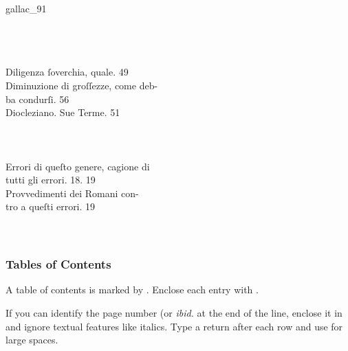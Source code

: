 
\begin{sampleImage}[ 2]{gallac_91}

\begin{typeLatin}
 \\
 \\
\someText \\
Diligenza ſoverchia, quale.  49 \\
Diminuzione di groſſezze, come deb- \\
 ba condurſi.  56 \\
Diocleziano. Sue Terme.  51  \\
\someText \\
 \\
\someText \\
Errori di queſto genere, cagione di \\
 tutti gli errori.  18. 19 \\
 Provvedimenti dei Romani con- \\
 tro a queſti errori.  19 \\
\someText \\
 \\
\end{typeLatin}
\end{sampleImage}


\subsubsection{Tables of Contents}
\label{section tables of contents}

\begin{mainrule}
  A table of contents is marked by . Enclose each entry with .

  If you can identify the page number (or \emph{ibid.} at the end of the line, enclose it in  and ignore textual features like italics. Type a return after each row and use  for large spaces.
\end{mainrule}

